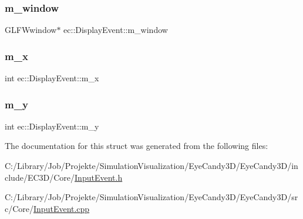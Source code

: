 \mbox{\label{structec_1_1_display_event_a501ab5209368544f1c264b3e25a87185}} 
\subsubsection{\texorpdfstring{m\+\_\+window}{m\_window}}
{\footnotesize\ttfamily G\+L\+F\+Wwindow$\ast$ ec\+::\+Display\+Event\+::m\+\_\+window}

\mbox{\label{structec_1_1_display_event_a35b371c7098cc98509f44e6fe2802945}} 
\subsubsection{\texorpdfstring{m\+\_\+x}{m\_x}}
{\footnotesize\ttfamily int ec\+::\+Display\+Event\+::m\+\_\+x}

\mbox{\label{structec_1_1_display_event_aa4314e0538f9929b39e37bb400ac2220}} 
\subsubsection{\texorpdfstring{m\+\_\+y}{m\_y}}
{\footnotesize\ttfamily int ec\+::\+Display\+Event\+::m\+\_\+y}



The documentation for this struct was generated from the following files\+:\begin{DoxyCompactItemize}
\item 
C\+:/\+Library/\+Job/\+Projekte/\+Simulation\+Visualization/\+Eye\+Candy3\+D/\+Eye\+Candy3\+D/include/\+E\+C3\+D/\+Core/\mbox{\hyperlink{_input_event_8h}{Input\+Event.\+h}}\item 
C\+:/\+Library/\+Job/\+Projekte/\+Simulation\+Visualization/\+Eye\+Candy3\+D/\+Eye\+Candy3\+D/src/\+Core/\mbox{\hyperlink{_input_event_8cpp}{Input\+Event.\+cpp}}\end{DoxyCompactItemize}
